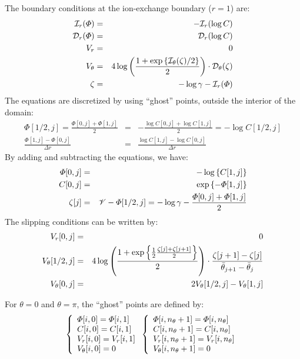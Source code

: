 The boundary conditions at the ion-exchange boundary ($r=1$) are:
\begin{eqnarray}
\cI_r(\varPhi) &=& -\cI_r(\log C) \\
\cD_r(\varPhi) &=& \cD_r(\log C) \\
V_r &=& 0 \\
V_\theta &=& 4\log\pars{\frac{1 + \exp\left\{\cI_\theta(\zeta)/2\right\}}{2}} \cdot 
			\cD_\theta(\zeta) \\
  \zeta &=& - \log \gamma - \cI_r(\varPhi)
\end{eqnarray}
The equations are discretized by using ``ghost'' points, outside the interior of the domain:
\begin{eqnarray}
 \varPhi[1/2, j] = \frac{\varPhi[0,j] + \varPhi[1,j]}{2} &=& 
	-\frac{\log C[0,j] + \log C[1,j]}{2} = -\log C[1/2, j] \\
  \frac{\varPhi[1,j] - \varPhi[0,j]}{\Delta r} &=& 
	\frac{\log C[1,j] - \log C[0,j]}{\Delta r} 
\end{eqnarray}
By adding and subtracting the equations, we have:
\begin{eqnarray}
\varPhi[0,j] &=& -\log\brcs{C[1,j]} \\
C[0,j] &=& \exp\brcs{-\varPhi[1,j]} \\
  \zeta[j] &=& \cV - \varPhi[1/2,j]
                     = -\log\gamma -\frac{\varPhi[0,j] + \varPhi[1,j]}{2}
\end{eqnarray}
The slipping conditions can be written by:
\begin{eqnarray}
V_r[0,j] &=& 0 \\
V_\theta[1/2,j] &=& 
4\log\pars{\frac{1 + \exp\left\{\frac{1}{2}\frac{\zeta[j] + \zeta[j+1]}{2}\right\}}{2}} 
\cdot \frac{\zeta[j+1] - \zeta[j]}{\bar{\theta}_{j+1} - \bar{\theta}_{j}} \\
  V_\theta[0,j] &=& 2 V_\theta[1/2, j] - V_\theta[1,j]
\end{eqnarray}

For $\theta = 0$ and $\theta = \pi$, the ``ghost'' points are defined by:
\begin{eqnarray} 
\brc{l}{
\varPhi[i, 0] = \varPhi[i, 1] \\
C[i, 0] = C[i, 1] \\
V_r[i, 0] = V_r[i, 1] \\
V_\theta[i, 0] = 0
} 
\brc{l}{
\varPhi[i, n_\theta+1] = \varPhi[i, n_\theta] \\
C[i, n_\theta+1] = C[i, n_\theta] \\
V_r[i, n_\theta+1] = V_r[i, n_\theta] \\
V_\theta[i, n_\theta+1] = 0
} 
\end{eqnarray}

